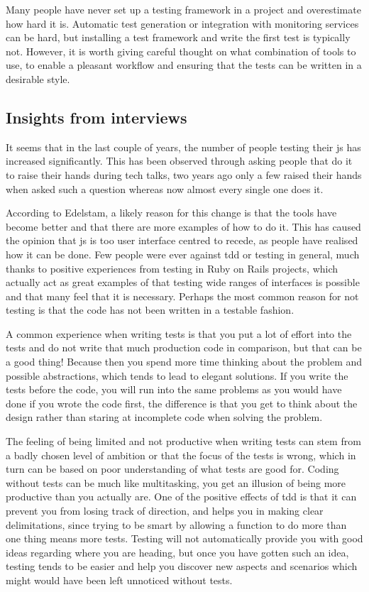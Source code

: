 \documentclass[11pt]{article}
\begin{document}
Many people have never set up a testing framework in a project and overestimate how hard it is. Automatic test generation or integration with monitoring services can be hard, but installing a test framework and write the first test is typically not. However, it is worth giving careful thought on what combination of tools to use, to enable a pleasant workflow and ensuring that the tests can be written in a desirable style.

\subsection{Insights from interviews}

It seems that in the last couple of years, the number of people testing their \gls{js} has increased significantly\cite[question~1]{Edelstam}. This has been observed through asking people that do it to raise their hands during tech talks, two years ago only a few raised their hands when asked such a question whereas now almost every single one does it.

According to Edelstam, a likely reason for this change is that the tools have become better and that there are more examples of how to do it. This has caused the opinion that \gls{js} is too user interface centred to recede, as people have realised how it can be done. Few people were ever against \gls{tdd} or testing in general, much thanks to positive experiences from testing in Ruby on Rails projects, which actually act as great examples of that testing wide ranges of interfaces is possible and that many feel that it is necessary. Perhaps the most common reason for not testing is that the code has not been written in a testable fashion. \cite[questions~2-3]{Edelstam}

A common experience when writing tests is that you put a lot of effort into the tests and do not write that much production code in comparison, but that can be a good thing! Because then you spend more time thinking about the problem and possible abstractions, which tends to lead to elegant solutions. If you write the tests before the code, you will run into the same problems as you would have done if you wrote the code first, the difference is that you get to think about the design rather than staring at incomplete code when solving the problem. \cite[question~8]{Edelstam}

The feeling of being limited and not productive when writing tests can stem from a badly chosen level of ambition or that the focus of the tests is wrong, which in turn can be based on poor understanding of what tests are good for. Coding without tests can be much like multitasking, you get an illusion of being more productive than you actually are. One of the positive effects of \gls{tdd} is that it can prevent you from losing track of direction, and helps you in making clear delimitations, since trying to be smart by allowing a function to do more than one thing means more tests. Testing will not automatically provide you with good ideas regarding where you are heading, but once you have gotten such an idea, testing tends to be easier and help you discover new aspects and scenarios which might would have been left unnoticed without tests. \cite[question~8]{Edelstam}
\end{document}
